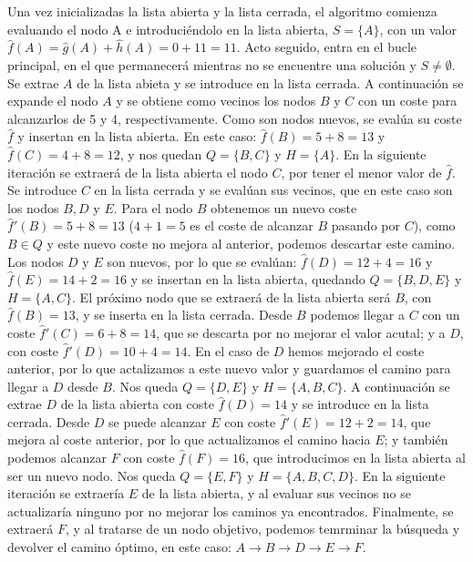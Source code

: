 \documentclass[a4paper,12pt]{article}
\begin{document}
Una vez inicializadas la lista abierta y la lista cerrada, el algoritmo comienza evaluando el nodo A e introduciéndolo en la lista abierta, $S = \{A\}$, con un valor $\hat{f}(A) = \hat{g}(A) + \hat{h}(A) = 0 + 11 = 11$. Acto seguido, entra en el bucle principal, en el que permanecerá mientras no se encuentre una solución y $S \neq \emptyset$. Se extrae $A$ de la lista abieta y se introduce en la lista cerrada. A continuación se expande el nodo $A$ y se obtiene como vecinos los nodos $B$ y $C$ con un coste para alcanzarlos de 5 y 4, respectivamente. Como son nodos nuevos, se evalúa su coste $\hat{f}$ y insertan en la lista abierta. En este caso: $\hat{f}(B) = 5 + 8 = 13$ y $\hat{f}(C) = 4 + 8 = 12$, y nos quedan $Q = \{B, C\}$ y $H=\{A\}$. En la siguiente iteración se extraerá de la lista abierta el nodo $C$, por tener el menor valor de $\hat{f}$. Se introduce $C$ en la lista cerrada y se evalúan sus vecinos, que en este caso son los nodos $B, D$ y $E$. Para el nodo $B$ obtenemos un nuevo coste $\hat{f}'(B) = 5 + 8 = 13$ ($4 + 1 = 5$ es el coste de alcanzar $B$ pasando por $C$), como $B \in Q$ y este nuevo coste no mejora al anterior, podemos descartar este camino. Los nodos $D$ y $E$ son nuevos, por lo que se evalúan: $\hat{f}(D) = 12 + 4 = 16$ y $\hat{f}(E) = 14 + 2 = 16$ y se insertan en la lista abierta, quedando $Q = \{B, D, E\}$ y $H = \{A, C\}$. El próximo nodo que se extraerá de la lista abierta será $B$, con $\hat{f}(B)= 13$, y se inserta en la lista cerrada. Desde $B$ podemos llegar a $C$ con un coste $\hat{f}'(C) = 6 + 8 = 14$, que se descarta por no mejorar el valor acutal; y a $D$, con coste $\hat{f}'(D) = 10 + 4 = 14$. En el caso de $D$ hemos mejorado el coste anterior, por lo que actalizamos a este nuevo valor y guardamos el camino para llegar a $D$ desde $B$. Nos queda $Q = \{D, E\}$ y $H = \{A, B, C\}$. A continuación se extrae $D$ de la lista abierta con coste $\hat{f}(D) = 14$ y se introduce en la lista cerrada. Desde $D$ se puede alcanzar $E$ con coste $\hat{f}'(E) = 12 + 2 = 14$, que mejora al coste anterior, por lo que actualizamos el camino hacia $E$; y también podemos alcanzar $F$ con coste $\hat{f}(F) = 16$, que introducimos en la lista abierta al ser un nuevo nodo. Nos queda $Q = \{E, F\}$ y $H = \{A, B, C, D\}$. En la siguiente iteración se extraería $E$ de la lista abierta, y al evaluar sus vecinos no se actualizaría ninguno por no mejorar los caminos ya encontrados. Finalmente, se extraerá $F$, y al tratarse de un nodo objetivo, podemos temrminar la búsqueda y devolver el camino óptimo, en este caso: $A \rightarrow B \rightarrow D \rightarrow E \rightarrow F$.
\end{document}
